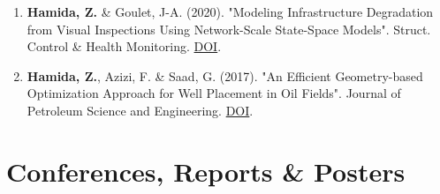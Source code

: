 \documentclass[10pt]{article}
\begin{document}
\begin{enumerate}
\item \textbf{Hamida, Z.} \& Goulet, J-A. (2020). "Modeling Infrastructure Degradation from Visual Inspections Using Network-Scale State-Space Models". Struct. Control \& Health Monitoring.
\href{http://doi.org/10.1002/stc.2582}{DOI}.

\item \textbf{Hamida, Z.}, Azizi, F. \& Saad, G. (2017). "An Efficient Geometry-based Optimization Approach for Well Placement in Oil Fields". Journal of Petroleum Science and Engineering. \href{http://dx.doi.org/10.1016/j.petrol.2016.10.055}{DOI}.

\end{enumerate}

\section{Conferences, Reports \& Posters}
\end{document}
